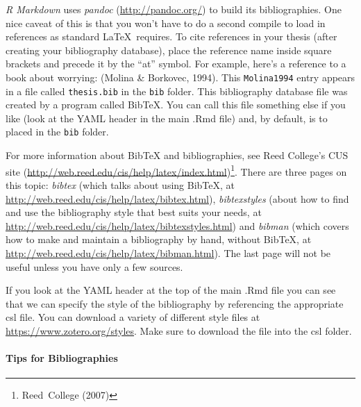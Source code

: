\documentclass[12pt,twoside]{amherstthesis}
\begin{document}
  \emph{R Markdown} uses \emph{pandoc} (\url{http://pandoc.org/}) to build
  its bibliographies. One nice caveat of this is that you won't have to do
  a second compile to load in references as standard \LaTeX~requires. To
  cite references in your thesis (after creating your bibliography
  database), place the reference name inside square brackets and precede
  it by the ``at'' symbol. For example, here's a reference to a book about
  worrying: (Molina \& Borkovec, 1994). This \texttt{Molina1994} entry
  appears in a file called \texttt{thesis.bib} in the \texttt{bib} folder.
  This bibliography database file was created by a program called BibTeX.
  You can call this file something else if you like (look at the YAML
  header in the main .Rmd file) and, by default, is to placed in the
  \texttt{bib} folder.
  
  For more information about BibTeX and bibliographies, see Reed College's
  CUS site (\url{http://web.reed.edu/cis/help/latex/index.html})\footnote{Reed~College
    (2007)}. There are three pages on this topic: \emph{bibtex} (which
  talks about using BibTeX, at
  \url{http://web.reed.edu/cis/help/latex/bibtex.html}),
  \emph{bibtexstyles} (about how to find and use the bibliography style
  that best suits your needs, at
  \url{http://web.reed.edu/cis/help/latex/bibtexstyles.html}) and
  \emph{bibman} (which covers how to make and maintain a bibliography by
  hand, without BibTeX, at
  \url{http://web.reed.edu/cis/help/latex/bibman.html}). The last page
  will not be useful unless you have only a few sources.
  
  If you look at the YAML header at the top of the main .Rmd file you can
  see that we can specify the style of the bibliography by referencing the
  appropriate csl file. You can download a variety of different style
  files at \url{https://www.zotero.org/styles}. Make sure to download the
  file into the csl folder.
  
  \paragraph{Tips for Bibliographies}\label{tips-for-bibliographies}
  
\end{document}
